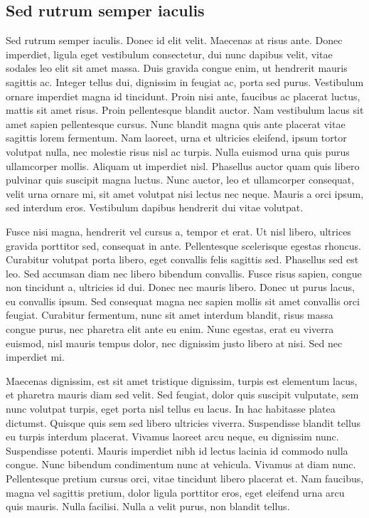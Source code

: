 \subsection{Sed rutrum semper iaculis}
Sed rutrum semper iaculis.
Donec id elit velit.
Maecenas at risus ante.
Donec imperdiet, ligula eget vestibulum consectetur, dui nunc dapibus velit, vitae sodales leo elit sit amet massa.
Duis gravida congue enim, ut hendrerit mauris sagittis ac.
Integer tellus dui, dignissim in feugiat ac, porta sed purus.
Vestibulum ornare imperdiet magna id tincidunt.
Proin nisi ante, faucibus ac placerat luctus, mattis sit amet risus.
Proin pellentesque blandit auctor.
Nam vestibulum lacus sit amet sapien pellentesque cursus.
Nunc blandit magna quis ante placerat vitae sagittis lorem fermentum.
Nam laoreet, urna et ultricies eleifend, ipsum tortor volutpat nulla, nec molestie risus nisl ac turpis.
Nulla euismod urna quis purus ullamcorper mollis.
Aliquam ut imperdiet nisl.
Phasellus auctor quam quis libero pulvinar quis suscipit magna luctus.
Nunc auctor, leo et ullamcorper consequat, velit urna ornare mi, sit amet volutpat nisi lectus nec neque.
Mauris a orci ipsum, sed interdum eros.
Vestibulum dapibus hendrerit dui vitae volutpat.

Fusce nisi magna, hendrerit vel cursus a, tempor et erat.
Ut nisl libero, ultrices gravida porttitor sed, consequat in ante.
Pellentesque scelerisque egestas rhoncus.
Curabitur volutpat porta libero, eget convallis felis sagittis sed.
Phasellus sed est leo.
Sed accumsan diam nec libero bibendum convallis.
Fusce risus sapien, congue non tincidunt a, ultricies id dui.
Donec nec mauris libero.
Donec ut purus lacus, eu convallis ipsum.
Sed consequat magna nec sapien mollis sit amet convallis orci feugiat.
Curabitur fermentum, nunc sit amet interdum blandit, risus massa congue purus, nec pharetra elit ante eu enim.
Nunc egestas, erat eu viverra euismod, nisl mauris tempus dolor, nec dignissim justo libero at nisi.
Sed nec imperdiet mi.

Maecenas dignissim, est sit amet tristique dignissim, turpis est elementum lacus, et pharetra mauris diam sed velit.
Sed feugiat, dolor quis suscipit vulputate, sem nunc volutpat turpis, eget porta nisl tellus eu lacus.
In hac habitasse platea dictumst.
Quisque quis sem sed libero ultricies viverra.
Suspendisse blandit tellus eu turpis interdum placerat.
Vivamus laoreet arcu neque, eu dignissim nunc.
Suspendisse potenti.
Mauris imperdiet nibh id lectus lacinia id commodo nulla congue.
Nunc bibendum condimentum nunc at vehicula.
Vivamus at diam nunc.
Pellentesque pretium cursus orci, vitae tincidunt libero placerat et.
Nam faucibus, magna vel sagittis pretium, dolor ligula porttitor eros, eget eleifend urna arcu quis mauris.
Nulla facilisi.
Nulla a velit purus, non blandit tellus.

